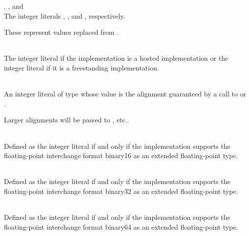 \begin{description}
\item
{}%
%
%
, , and \\
The integer literals , , and , respectively.
\begin{note}
These represent values replaced from .
\end{note}

\item
{}%
%
%
\\
The integer literal 
if the implementation is a hosted implementation or
the integer literal 
if it is a freestanding implementation.

\item
{}%
\\
An integer literal of type 
whose value is the alignment guaranteed
by a call to 
or .
\begin{note}
Larger alignments will be passed to
, etc..
\end{note}

\item
{}%
\\
Defined as the integer literal 
if and only if the implementation supports
the \IsoFloatUndated{} floating-point interchange format binary16
as an extended floating-point type.

\item
{}%
\\
Defined as the integer literal 
if and only if the implementation supports
the \IsoFloatUndated{} floating-point interchange format binary32
as an extended floating-point type.

\item
{}%
\\
Defined as the integer literal 
if and only if the implementation supports
the \IsoFloatUndated{} floating-point interchange format binary64
as an extended floating-point type.


\end{description}
